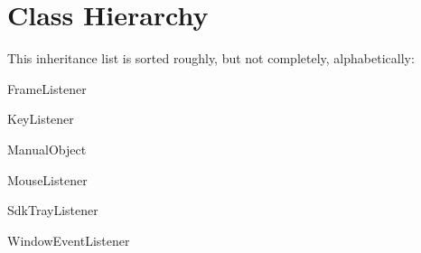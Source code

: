 \section{Class Hierarchy}
This inheritance list is sorted roughly, but not completely, alphabetically\+:\begin{DoxyCompactList}
\item Frame\+Listener\begin{DoxyCompactList}
\item {}
\begin{DoxyCompactList}
\item {}
\end{DoxyCompactList}
\end{DoxyCompactList}
\item Key\+Listener\begin{DoxyCompactList}
\item {}
\end{DoxyCompactList}
\item Manual\+Object\begin{DoxyCompactList}
\item {}
\end{DoxyCompactList}
\item Mouse\+Listener\begin{DoxyCompactList}
\item {}
\end{DoxyCompactList}
\item Sdk\+Tray\+Listener\begin{DoxyCompactList}
\item {}
\end{DoxyCompactList}
\item {}
\item Window\+Event\+Listener\begin{DoxyCompactList}
\item {}
\end{DoxyCompactList}
\end{DoxyCompactList}
